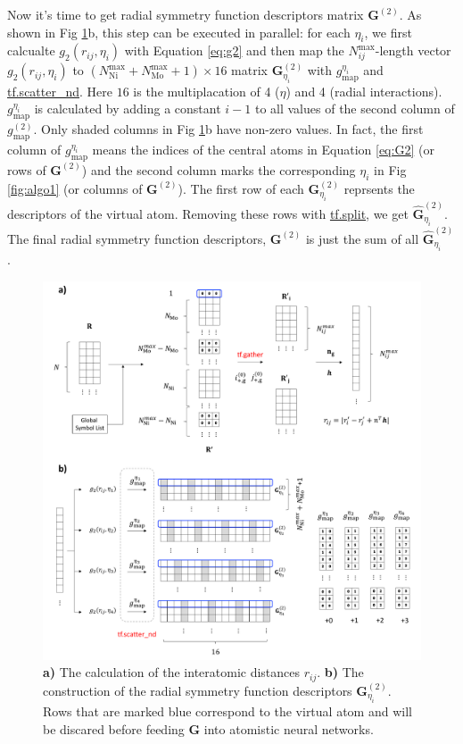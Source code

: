 \documentclass[prb,preprint]{revtex4-2}
\begin{document}
Now it's time to get radial symmetry function descriptors matrix 
$\mathbf{G}^{(2)}$. 
As shown in Fig \ref{fig:algo3}b, this step can be executed in parallel: 
for each $\eta_i$, we first calcualte $g_2(r_{ij}, \eta_i)$ with 
Equation \ref{eq:g2} and then map the $N_{ij}^{\mathrm{max}}$-length vector 
$g_2(r_{ij}, \eta_i)$ to 
$(N_{\mathrm{Ni}}^{\mathrm{max}}+N_{\mathrm{Mo}}^{\mathrm{max}}+1) \times 16$ 
matrix $\mathbf{G}^{(2)}_{\eta_i}$ with $g^{\eta_i}_{\mathrm{map}}$ and 
\href{https://www.tensorflow.org/versions/r1.12/api_docs/python/tf/scatter_nd}
{tf.scatter\_nd}. Here $16$ is the multiplacation of 4 ($\eta$) and 4 
(radial interactions). 
$g^{\eta_i}_{\mathrm{map}}$ is calculated by adding a constant
$i - 1$ to all values of the second column of $g^{(2)}_{\mathrm{map}}$. Only 
shaded columns in Fig \ref{fig:algo3}b have non-zero values.
In fact, the first column of $g^{\eta_i}_{\mathrm{map}}$ means the indices of 
the central atoms in Equation \ref{eq:G2} (or rows of $\mathbf{G}^{(2)}$) and 
the second column marks the corresponding $\eta_i$ in Fig \ref{fig:algo1} (or 
columns of $\mathbf{G}^{(2)}$).
The first row of each $\mathbf{G}^{(2)}_{\eta_i}$ reprsents the descriptors of 
the virtual atom. Removing these rows with
\href{https://www.tensorflow.org/versions/r1.12/api_docs/python/tf/split}
{tf.split}, we get $\hat{\mathbf{G}}^{(2)}_{\eta_i}$.
The final radial symmetry function descriptors, $\mathbf{G}^{(2)}$ is just the 
sum of all $\hat{\mathbf{G}}^{(2)}_{\eta_i}$.

\begin{figure}[h!]
\centering
\includegraphics[scale=0.5]{figures/Fig3-G2.pdf}
\caption{\label{fig:algo3} 
\textbf{a)} The calculation of the interatomic distances $r_{ij}$.
\textbf{b)} The construction of the radial symmetry function descriptors 
$\mathbf{G}^{(2)}_{\eta_i}$. Rows that are marked blue correspond to the virtual 
atom and will be discared before feeding $\mathbf{G}$ into atomistic neural 
networks.
}
\end{figure}
\end{document}
